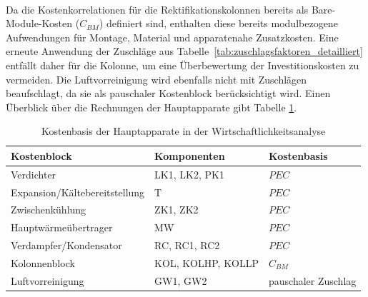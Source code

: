 \\
Da die Kostenkorrelationen für die Rektifikationskolonnen bereits als Bare-Module-Kosten ($C_{BM}$) definiert sind, enthalten diese bereits modulbezogene Aufwendungen für Montage, Material und apparatenahe
Zusatzkosten. Eine erneute Anwendung der Zuschläge aus Tabelle~\ref{tab:zuschlagsfaktoren_detailliert} entfällt daher für die Kolonne, um eine Überbewertung der Investitionskosten zu vermeiden. Die Luftvorreinigung wird ebenfalls nicht mit Zuschlägen beaufschlagt, da sie als pauschaler Kostenblock berücksichtigt wird. Einen Überblick über die Rechnungen der Hauptapparate gibt Tabelle \ref{tab:kostenbasis_hauptapparate}.

\begin{table}[H]
\centering
\caption{Kostenbasis der Hauptapparate in der Wirtschaftlichkeitsanalyse}
\label{tab:kostenbasis_hauptapparate}
\begin{tabular}{lll}
\hline
Kostenblock & Komponenten & Kostenbasis \\
\hline
Verdichter & LK1, LK2, PK1 & $PEC$ \\
Expansion/Kältebereitstellung & T & $PEC$ \\
Zwischenkühlung & ZK1, ZK2 & $PEC$ \\
Hauptwärmeübertrager & MW & $PEC$ \\
Verdampfer/Kondensator & RC, RC1, RC2 & $PEC$ \\
Kolonnenblock & KOL, KOLHP, KOLLP & $C_{BM}$ \\
Luftvorreinigung & GW1, GW2 & pauschaler Zuschlag \\
\hline
\end{tabular}
\end{table}
